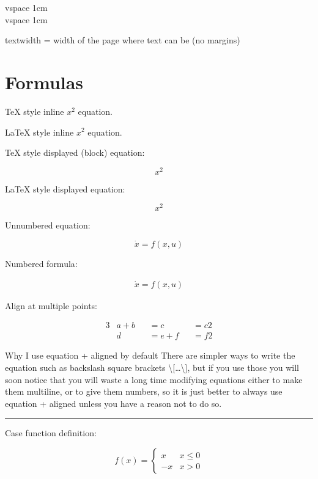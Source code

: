 \documentclass[12pt]{article}
\begin{document}
    vspace 1cm \\[1cm]

    vspace 1cm

  textwidth = width of the page where text can be (no margins)

\section{Formulas}\label{formulas} %

  TeX style inline $x^2$ equation.

  LaTeX style inline \(x^2\) equation.

  TeX style displayed (block) equation:

  $$x^2$$

  LaTeX style displayed equation:

  \[ x^2 \]

  Unnumbered equation:

  \begin{equation*}
    \dot{x} = f(x,u)
  \end{equation*}

  Numbered formula:

  \begin{equation}\begin{aligned}\label{eqFor1}
    \dot{x} = f(x,u)
  \end{aligned}\end{equation}

  Align at multiple points:

      \begin{alignat*}{3}
        & a + b && = c   && = c2 \\
        & d   && = e + f && = f2
      \end{alignat*}

  \begin{remark}\label{remFor1} Why I use equation + aligned by default
    There are simpler ways to write the equation such as backslash square brackets \textbackslash{}[\ldots\textbackslash{}],
    but if you use those you will soon notice that you will waste a long time modifying equations
    either to make them multiline, or to give them numbers, so it is just better to always use
    equation + aligned unless you have a reason not to do so.
  \end{remark}\hrule

  Case function definition:

  \begin{equation}
    f(x) =
    \begin{cases}
      x & x \le 0 \\
      -x & x>0
    \end{cases}
  \end{equation}
\end{document}
